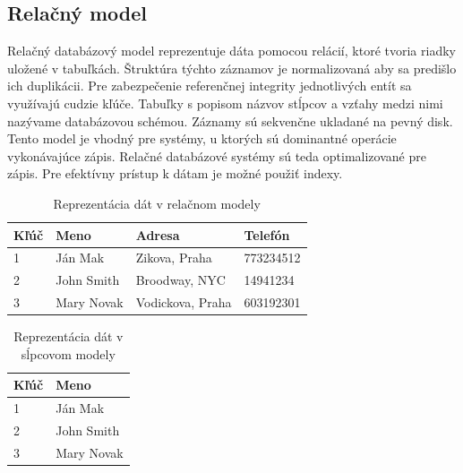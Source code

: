 \documentclass[11pt,twoside,a4paper]{book}
\begin{document}

\subsection{Relačný model}
Relačný databázový model reprezentuje dáta pomocou relácií, ktoré tvoria riadky uložené v tabuľkách. Štruktúra týchto záznamov je normalizovaná aby sa predišlo ich duplikácii. Pre zabezpečenie referenčnej integrity jednotlivých entít sa využívajú cudzie kľúče. Tabuľky s popisom názvov stĺpcov a vzťahy medzi nimi nazývame databázovou schémou. Záznamy sú sekvenčne ukladané na pevný disk. Tento model je vhodný pre systémy, u ktorých sú dominantné operácie vykonávajúce zápis. Relačné databázové systémy sú teda optimalizované pre zápis. Pre efektívny prístup k dátam je možné použiť indexy.



\begin{table}[hp]
\begin{center}
    \begin{tabular}{l|l|l|l}

  Kľúč & Meno & Adresa & Telefón\\ \hline

  1&Ján Mak & Zikova, Praha & 773234512 \\
  2&John Smith  & Broodway, NYC & 14941234\\
  3&Mary Novak & Vodickova, Praha & 603192301\\

    \end{tabular}
\end{center}
\caption{Reprezentácia dát v relačnom modely}
\label{tab:Nosql}
\end{table}


\begin{table}[hp]
\begin{center}
    \begin{tabular}{l|l}

  Kľúč & Meno \\ \hline

  1&Ján Mak  \\
  2&John Smith\\
  3&Mary Novak \\

    \end{tabular}
\end{center}
\caption{Reprezentácia dát v sĺpcovom modely}
\label{tab:Nosql}
\end{table}
\end{document}
